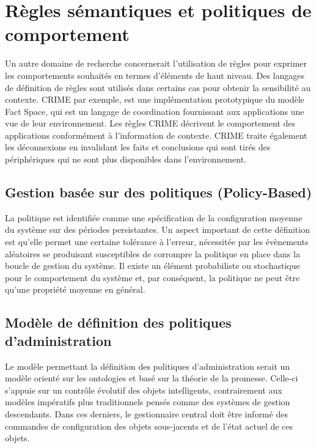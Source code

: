 \section{Règles sémantiques et politiques de comportement}

Un autre domaine de recherche concernerait l'utilisation de règles pour exprimer
les comportements souhaités en termes d'éléments de haut niveau. Des langages
de définition de règles sont utilisés dans certains cas pour obtenir la
sensibilité au contexte. CRIME \cite{murphy_coordination_2007} par exemple, est
une implémentation prototypique du modèle Fact Space, qui est un langage de
coordination fournissant aux applications une vue de leur environnement. Les
règles CRIME décrivent le comportement des applications conformément à
l'information de contexte. CRIME traite également les déconnexions en invalidant
les faits et conclusions qui sont tirés des périphériques qui ne sont plus
disponibles dans l'environnement.

\subsection{Gestion basée sur des politiques (Policy-Based)}

La politique est identifiée comme une spécification de la configuration moyenne
du système sur des périodes persistantes. Un aspect important de cette
définition est qu'elle permet une certaine tolérance à l'erreur, nécessitée par
les évènements aléatoires se produisant susceptibles de corrompre la politique
en place dans la boucle de gestion du système. Il existe un élément probabiliste
ou stochastique pour le comportement du système et, par conséquent, la politique
ne peut être qu'une propriété moyenne en général.

\subsection{Modèle de définition des politiques d'administration}

Le modèle permettant la définition des politiques d'administration serait un
modèle orienté sur les ontologies et basé sur la théorie de la promesse.
Celle-ci s'appuie sur un contrôle évolutif des objets intelligents,
contrairement aux modèles impératifs plus traditionnels pensés comme des
systèmes de gestion descendants. Dans ces derniers, le gestionnaire central
doit être informé des commandes de configuration des objets sous-jacents et de
l'état actuel de ces objets.


